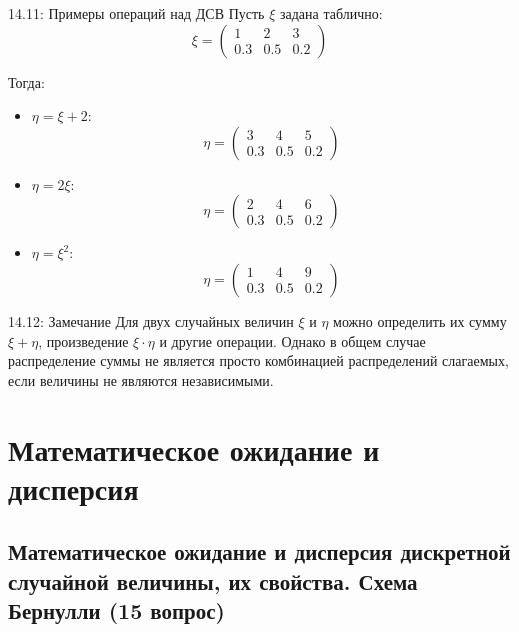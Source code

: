 \documentclass[a4paper,12pt]{article}
\begin{document}
	\begin{examplebox}{14.11: Примеры операций над ДСВ}
		Пусть \(\xi\) задана таблично:
		\[ \xi = \begin{pmatrix}
			1 & 2 & 3 \\
			0.3 & 0.5 & 0.2
		\end{pmatrix} \]
		
		Тогда:
		\begin{itemize}
			\item \(\eta = \xi + 2\):
			\[ \eta = \begin{pmatrix}
				3 & 4 & 5 \\
				0.3 & 0.5 & 0.2
			\end{pmatrix} \]
			
			\item \(\eta = 2\xi\):
			\[ \eta = \begin{pmatrix}
				2 & 4 & 6 \\
				0.3 & 0.5 & 0.2
			\end{pmatrix} \]
			
			\item \(\eta = \xi^2\):
			\[ \eta = \begin{pmatrix}
				1 & 4 & 9 \\
				0.3 & 0.5 & 0.2
			\end{pmatrix} \]
		\end{itemize}
	\end{examplebox}
	
	\begin{notebook}{14.12: Замечание}
		Для двух случайных величин \(\xi\) и \(\eta\) можно определить их сумму \(\xi + \eta\), произведение \(\xi \cdot \eta\) и другие операции. Однако в общем случае распределение суммы не является просто комбинацией распределений слагаемых, если величины не являются независимыми.
	\end{notebook}
	
	
	
	
	
	\newpage
	\section{Математическое ожидание и дисперсия}
	
	\subsection{Математическое ожидание и дисперсия дискретной случайной величины, их свойства. Схема Бернулли (15 вопрос)}
	
\end{document}
